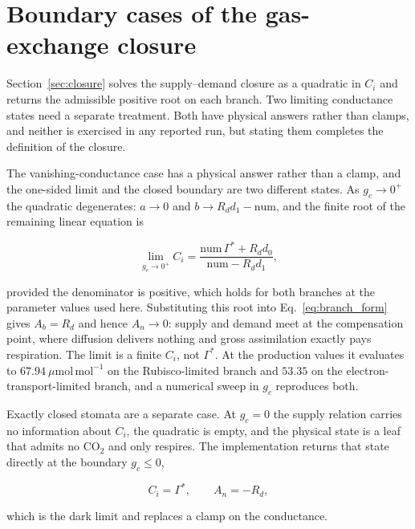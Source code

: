 \appendix

\section{Boundary cases of the gas-exchange closure}
\label{app:closure}

Section~\ref{sec:closure} solves the supply--demand closure as a quadratic in
$C_i$ and returns the admissible positive root on each branch. Two limiting
conductance states need a separate treatment. Both have physical answers rather
than clamps, and neither is exercised in any reported run, but stating them
completes the definition of the closure.

The vanishing-conductance case has a physical answer rather than a clamp, and the
one-sided limit and the closed boundary are two different states. As
$g_c \to 0^{+}$ the quadratic degenerates: $a \to 0$ and
$b \to R_d d_1 - \mathrm{num}$, and the finite root of the remaining linear
equation is

\begin{equation}
\lim_{g_c \to 0^{+}} C_i
= \frac{\mathrm{num}\,\Gamma^{*} + R_d d_0}{\mathrm{num} - R_d d_1},
\label{eq:ci_limit}
\end{equation}

provided the denominator is positive, which holds for both branches at the
parameter values used here. Substituting this root into
Eq.~\eqref{eq:branch_form} gives $A_b = R_d$ and hence $A_n \to 0$: supply and
demand meet at the compensation point, where diffusion delivers nothing and
gross assimilation exactly pays respiration. The limit is a finite
$C_i$, not $\Gamma^{*}$. At the production values it evaluates to
$67.94~\mu\mathrm{mol\,mol^{-1}}$ on the Rubisco-limited branch and
$53.35$ on the electron-transport-limited branch, and a numerical sweep in
$g_c$ reproduces both.

Exactly closed stomata are a separate case. At $g_c = 0$ the supply relation
carries no information about $C_i$, the quadratic is empty, and the physical
state is a leaf that admits no CO$_2$ and only respires. The implementation
returns that state directly at the boundary $g_c \leq 0$,

\begin{equation}
C_i = \Gamma^{*}, \qquad A_n = -R_d ,
\label{eq:ci_dark}
\end{equation}

which is the dark limit and replaces a clamp on the conductance.


